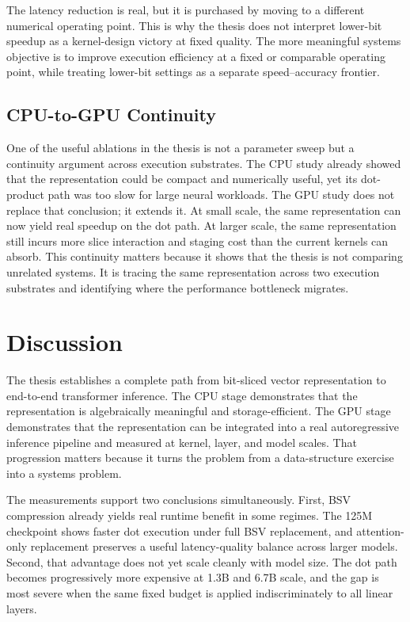 The latency reduction is real, but it is purchased by moving to a different numerical operating point. This is why the thesis does not interpret lower-bit speedup as a kernel-design victory at fixed quality. The more meaningful systems objective is to improve execution efficiency at a fixed or comparable operating point, while treating lower-bit settings as a separate speed--accuracy frontier.

\subsection{CPU-to-GPU Continuity}
One of the useful ablations in the thesis is not a parameter sweep but a continuity argument across execution substrates. The CPU study already showed that the representation could be compact and numerically useful, yet its dot-product path was too slow for large neural workloads. The GPU study does not replace that conclusion; it extends it. At small scale, the same representation can now yield real speedup on the dot path. At larger scale, the same representation still incurs more slice interaction and staging cost than the current kernels can absorb. This continuity matters because it shows that the thesis is not comparing unrelated systems. It is tracing the same representation across two execution substrates and identifying where the performance bottleneck migrates.

\section{Discussion}\label{sec:discussion}
The thesis establishes a complete path from bit-sliced vector representation to end-to-end transformer inference. The CPU stage demonstrates that the representation is algebraically meaningful and storage-efficient. The GPU stage demonstrates that the representation can be integrated into a real autoregressive inference pipeline and measured at kernel, layer, and model scales. That progression matters because it turns the problem from a data-structure exercise into a systems problem.

The measurements support two conclusions simultaneously. First, BSV compression already yields real runtime benefit in some regimes. The 125M checkpoint shows faster dot execution under full BSV replacement, and attention-only replacement preserves a useful latency-quality balance across larger models. Second, that advantage does not yet scale cleanly with model size. The dot path becomes progressively more expensive at 1.3B and 6.7B scale, and the gap is most severe when the same fixed budget is applied indiscriminately to all linear layers.

